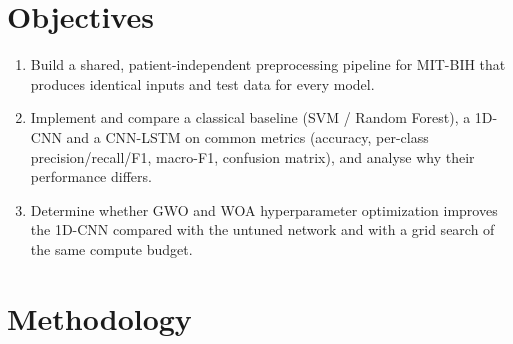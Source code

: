 \documentclass[11pt,a4paper]{article}
\begin{document}
\section{Objectives}
\begin{enumerate}
\item Build a shared, patient-independent preprocessing pipeline for MIT-BIH that produces identical inputs and test data for every model.
\item Implement and compare a classical baseline (SVM / Random Forest), a 1D-CNN and a CNN-LSTM on common metrics (accuracy, per-class precision/recall/F1, macro-F1, confusion matrix), and analyse why their performance differs.
\item Determine whether GWO and WOA hyperparameter optimization improves the 1D-CNN compared with the untuned network and with a grid search of the same compute budget.
\end{enumerate}

\section{Methodology}
\end{document}
